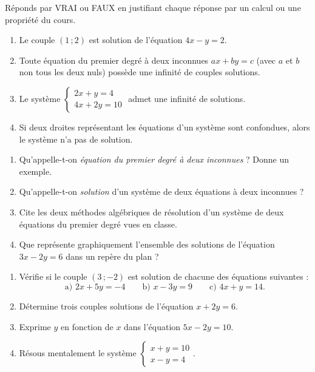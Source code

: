 \documentclass[11pt]{article}
\begin{document}
\begin{exercice}
Réponds par VRAI ou FAUX en justifiant chaque réponse par un calcul ou une propriété du cours.
\begin{enumerate}
\item Le couple $(1\,;2)$ est solution de l'équation $4x - y = 2$.
\item Toute équation du premier degré à deux inconnues $ax + by = c$ (avec $a$ et $b$ non tous les deux nuls) possède une infinité de couples solutions.
\item Le système $\begin{cases} 2x + y = 4 \\ 4x + 2y = 10 \end{cases}$ admet une infinité de solutions.
\item Si deux droites représentant les équations d'un système sont confondues, alors le système n'a pas de solution.
\end{enumerate}
\end{exercice}

\begin{exercice}
\begin{enumerate}
\item Qu'appelle-t-on \emph{équation du premier degré à deux inconnues} ? Donne un exemple.
\item Qu'appelle-t-on \emph{solution} d'un système de deux équations à deux inconnues ?
\item Cite les deux méthodes algébriques de résolution d'un système de deux équations du premier degré vues en classe.
\item Que représente graphiquement l'ensemble des solutions de l'équation $3x - 2y = 6$ dans un repère du plan ?
\end{enumerate}
\end{exercice}

\begin{exercice}
\begin{enumerate}
\item Vérifie si le couple $(3\,;-2)$ est solution de chacune des équations suivantes :
\[ \text{a) } 2x + 5y = -4 \qquad \text{b) } x - 3y = 9 \qquad \text{c) } 4x + y = 14. \]
\item Détermine trois couples solutions de l'équation $x + 2y = 6$.
\item Exprime $y$ en fonction de $x$ dans l'équation $5x - 2y = 10$.
\item Résous mentalement le système $\begin{cases} x + y = 10 \\ x - y = 4 \end{cases}$.
\end{enumerate}
\end{exercice}
\end{document}
